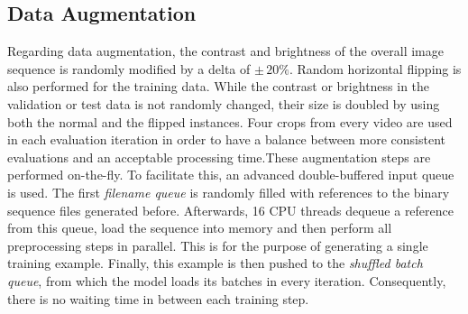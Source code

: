 \subsection{Data Augmentation}

Regarding data augmentation, the contrast and brightness of the overall image sequence is randomly modified by a delta of $ \pm\,20\% $. Random horizontal flipping is also performed for the training data. While the contrast or brightness in the validation or test data is not randomly changed, their size is doubled by using both the normal and the flipped instances. Four crops from every video are used in each evaluation iteration in order to have a balance between more consistent evaluations and an acceptable processing time.These augmentation steps are performed on-the-fly. To facilitate this, an advanced double-buffered input queue is used. The first \textit{filename queue} is randomly filled with references to the binary sequence files generated before. Afterwards, \num{16} CPU threads dequeue a reference from this queue, load the sequence into memory and then perform all preprocessing steps in parallel. This is for the purpose of generating a single training example. Finally, this example is then pushed to the \textit{shuffled batch queue}, from which the model loads its batches in every iteration. Consequently, there is no waiting time in between each training step.
